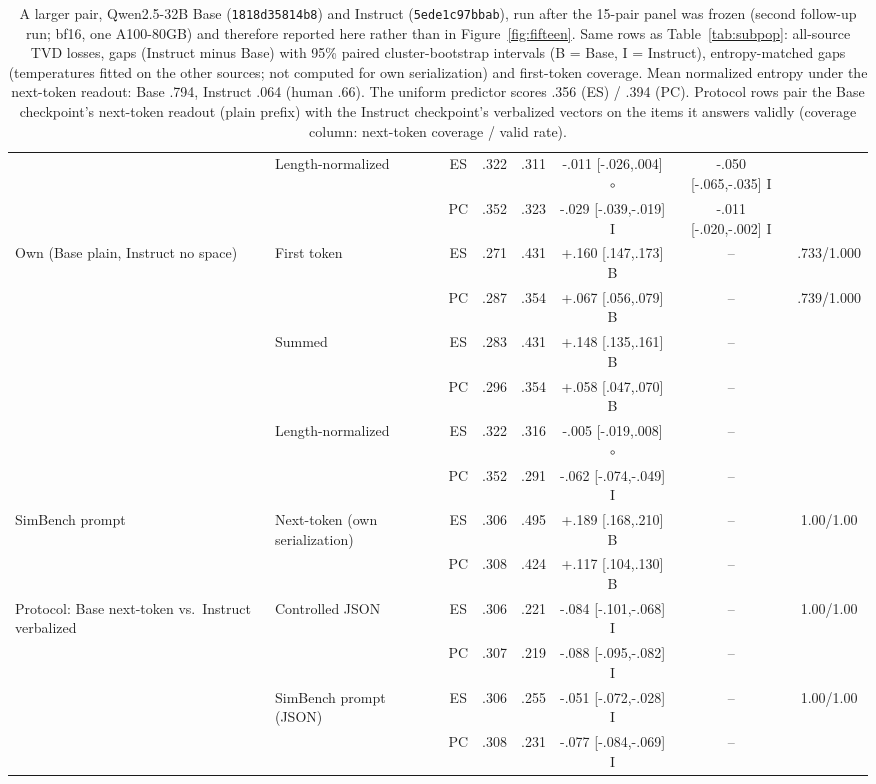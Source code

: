 \begin{table}[t]
\begin{tabular}{@{}llcccccc@{}}
 & Length-normalized & ES & .322 & .311 & -.011 [-.026,.004] $\circ$ & -.050 [-.065,-.035] I &  \\
 &  & PC & .352 & .323 & -.029 [-.039,-.019] I & -.011 [-.020,-.002] I &  \\
Own (Base plain, Instruct no space) & First token & ES & .271 & .431 & +.160 [.147,.173] B & -- & .733/1.000 \\
 &  & PC & .287 & .354 & +.067 [.056,.079] B & -- & .739/1.000 \\
 & Summed & ES & .283 & .431 & +.148 [.135,.161] B & -- &  \\
 &  & PC & .296 & .354 & +.058 [.047,.070] B & -- &  \\
 & Length-normalized & ES & .322 & .316 & -.005 [-.019,.008] $\circ$ & -- &  \\
 &  & PC & .352 & .291 & -.062 [-.074,-.049] I & -- &  \\
SimBench prompt & Next-token (own serialization) & ES & .306 & .495 & +.189 [.168,.210] B & -- & 1.00/1.00 \\
 &  & PC & .308 & .424 & +.117 [.104,.130] B & -- &  \\
Protocol: Base next-token vs.\ Instruct verbalized & Controlled JSON & ES & .306 & .221 & -.084 [-.101,-.068] I & -- & 1.00/1.00 \\
 &  & PC & .307 & .219 & -.088 [-.095,-.082] I & -- &  \\
 & SimBench prompt (JSON) & ES & .306 & .255 & -.051 [-.072,-.028] I & -- & 1.00/1.00 \\
 &  & PC & .308 & .231 & -.077 [-.084,-.069] I & -- &  \\
\bottomrule
\end{tabular}
\caption{A larger pair, Qwen2.5-32B Base (\texttt{1818d35814b8}) and Instruct (\texttt{5ede1c97bbab}), run after the 15-pair panel was frozen (second follow-up run; bf16, one A100-80GB) and therefore reported here rather than in Figure~\ref{fig:fifteen}. Same rows as Table~\ref{tab:subpop}: all-source TVD losses, gaps (Instruct minus Base) with 95\% paired cluster-bootstrap intervals (B = Base, I = Instruct), entropy-matched gaps (temperatures fitted on the other sources; not computed for own serialization) and first-token coverage. Mean normalized entropy under the next-token readout: Base .794, Instruct .064 (human .66). The uniform predictor scores .356 (ES) / .394 (PC). Protocol rows pair the Base checkpoint's next-token readout (plain prefix) with the Instruct checkpoint's verbalized vectors on the items it answers validly (coverage column: next-token coverage / valid rate).}
\label{tab:qwen32b}
\end{table}
